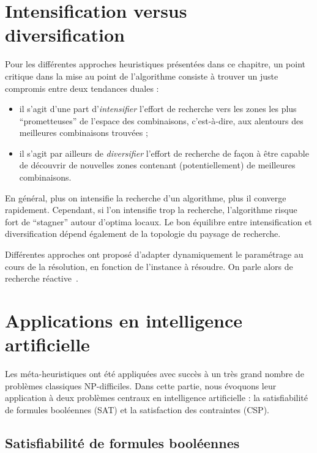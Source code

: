\documentclass[12pt,a4paper]{book}
\begin{document}
\section{Intensification versus diversification}
\label{sec:intensification}

Pour les différentes approches heuristiques présentées dans ce chapitre, un point critique dans la mise au point de l'algorithme consiste à trouver un juste compromis entre deux tendances duales :
\begin{itemize}
  \item il s'agit d'une part d'\textit{intensifier} l'effort de recherche vers les zones les plus ``prometteuses'' de l'espace des combinaisons, c'est-à-dire, aux alentours des meilleures combinaisons trouvées ;
  \item il s'agit par ailleurs de \textit{diversifier} l'effort de recherche de façon à être capable de découvrir de nouvelles zones contenant (potentiellement) de meilleures combinaisons.
\end{itemize}

En général, plus on intensifie la recherche d'un algorithme, plus il converge rapidement. Cependant, si l'on intensifie trop la recherche, l'algorithme risque fort de ``stagner'' autour d'optima locaux. Le bon équilibre entre intensification et diversification dépend également de la topologie du paysage de recherche.

Différentes approches ont proposé d'adapter dynamiquement le paramétrage au cours de la résolution, en fonction de l'instance à résoudre. On parle alors de recherche réactive~\cite{battiti2008}.

\section{Applications en intelligence artificielle}
\label{sec:applications}

Les méta-heuristiques ont été appliquées avec succès à un très grand nombre de problèmes classiques NP-difficiles. Dans cette partie, nous évoquons leur application à deux problèmes centraux en intelligence artificielle : la satisfiabilité de formules booléennes (SAT) et la satisfaction des contraintes (CSP).

\subsection{Satisfiabilité de formules booléennes}
\label{sec:sat}
\end{document}
